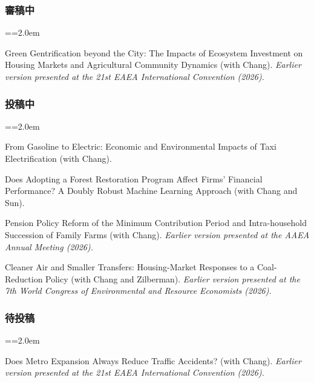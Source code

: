 \documentclass[11pt,letterpaper]{article}
\newenvironment{hanglist}{\par\setlength{\parindent}{0pt}\everypar={\hangindent=2.0em\hangafter=1}}{\par}
\begin{document}
\subsubsection{審稿中}\label{ux5be9ux7a3fux4e2d}

\begin{hanglist}

Green Gentrification beyond the City: The Impacts
of Ecosystem Investment on Housing Markets and Agricultural Community
Dynamics (with Chang).
\newline \textit{Earlier version presented at the 21st EAEA International Convention (2026).}

\end{hanglist}

\subsubsection{投稿中}\label{ux6295ux7a3fux4e2d}

\begin{hanglist}

From Gasoline to Electric: Economic and
Environmental Impacts of Taxi Electrification (with Chang).

Does Adopting a Forest Restoration Program Affect
Firms' Financial Performance? A Doubly Robust Machine Learning Approach
(with Chang and Sun).

Pension Policy Reform of the Minimum Contribution
Period and Intra-household Succession of Family Farms (with Chang).
\newline \textit{Earlier version presented at the AAEA Annual Meeting (2026).}

Cleaner Air and Smaller Transfers: Housing-Market
Responses to a Coal-Reduction Policy (with Chang and Zilberman).
\newline \textit{Earlier version presented at the 7th World Congress of Environmental and Resource Economists (2026).}

\end{hanglist}

\subsubsection{待投稿}\label{ux5f85ux6295ux7a3f}

\begin{hanglist}

Does Metro Expansion Always Reduce Traffic
Accidents? (with Chang).
\newline \textit{Earlier version presented at the 21st EAEA International Convention (2026).}

\end{hanglist}
\end{document}
